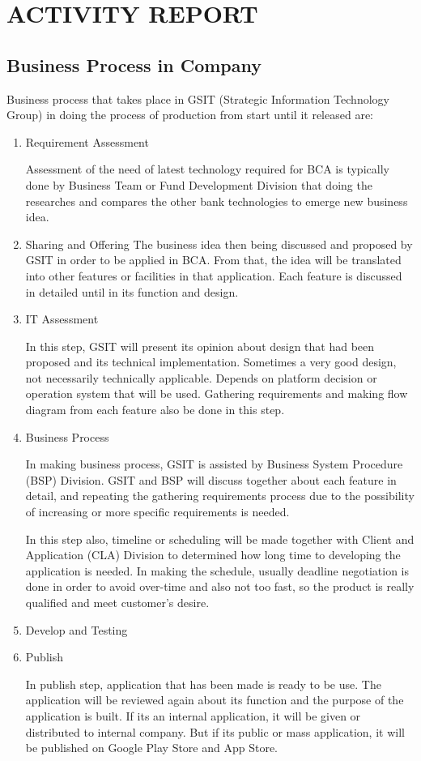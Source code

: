 \chapter{ACTIVITY REPORT}
\section{Business Process in Company}
Business process that takes place in GSIT (Strategic Information Technology Group) in doing the process of production from start until it released are:
\begin{enumerate}
\item Requirement Assessment

Assessment of the need of latest technology required for BCA is typically done by Business Team or Fund Development Division  that doing the researches and compares the other bank technologies to emerge new business idea.

\item Sharing and Offering
The business idea then being discussed and proposed by GSIT in order to be applied in BCA. From that, the idea will be translated into other features or facilities in that application. Each feature is discussed in detailed until in its function and design.

\item IT Assessment

In this step, GSIT will present its opinion about design that had been proposed and its technical implementation. Sometimes a very good design, not necessarily technically applicable. Depends on platform decision or operation system that will be used. Gathering requirements and making flow diagram from each feature also be done in this step.

\item Business Process

In making business process, GSIT is assisted by Business System Procedure (BSP) Division. GSIT and BSP will discuss together about each feature in detail, and repeating the gathering requirements process due to the possibility of increasing or more specific requirements is needed.

In this step also, timeline or scheduling will be made together with Client and Application (CLA) Division to determined how long time to developing the application is needed. In making the schedule, usually deadline negotiation  is done in order to avoid over-time and also not too fast, so the product is really qualified and meet customer's desire.

\item Develop and Testing

\item Publish

In publish step, application that has been made is ready to be use. The application will be reviewed again about its function and the purpose of the application is built. If its an internal application, it will be given or distributed to internal company. But if its public or mass application, it will be published on Google Play Store and App Store.

\end{enumerate}
